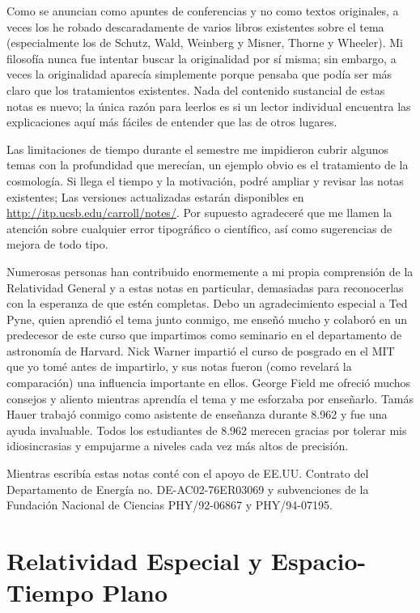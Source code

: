 \documentclass[11pt,b5paper,openany,twoside]{book}
\begin{document}
Como se anuncian como apuntes de conferencias y no como textos originales, a veces los he robado descaradamente de varios libros existentes sobre el tema (especialmente los de Schutz, Wald, Weinberg y Misner, Thorne y Wheeler).
Mi filosofía nunca fue intentar buscar la originalidad por sí misma; sin embargo, a veces la originalidad aparecía simplemente porque pensaba que podía ser más claro que los tratamientos existentes.
Nada del contenido sustancial de estas notas es nuevo; la única razón para leerlos es si un lector individual encuentra las explicaciones aquí más fáciles de entender que las de otros lugares.

Las limitaciones de tiempo durante el semestre me impidieron cubrir algunos temas con la profundidad que merecían, un ejemplo obvio es el tratamiento de la cosmología.
Si llega el tiempo y la motivación, podré ampliar y revisar las notas existentes; Las versiones actualizadas estarán disponibles en \href{http://itp.ucsb.edu/carroll/notes/}{http://itp.ucsb.edu/carroll/notes/}.
Por supuesto agradeceré que me llamen la atención sobre cualquier error tipográfico o científico, así como sugerencias de mejora de todo tipo.

Numerosas personas han contribuido enormemente a mi propia comprensión de la Relatividad General y a estas notas en particular, demasiadas para reconocerlas con la esperanza de que estén completas.
Debo un agradecimiento especial a Ted Pyne, quien aprendió el tema junto conmigo, me enseñó mucho y colaboró en un predecesor de este curso que impartimos como seminario en el departamento de astronomía de Harvard.
Nick Warner impartió el curso de posgrado en el MIT que yo tomé antes de impartirlo, y sus notas fueron (como revelará la comparación) una influencia importante en ellos.
George Field me ofreció muchos consejos y aliento mientras aprendía el tema y me esforzaba por enseñarlo.
Tamás Hauer trabajó conmigo como asistente de enseñanza durante 8.962 y fue una ayuda invaluable.
Todos los estudiantes de 8.962 merecen gracias por tolerar mis idiosincrasias y empujarme a niveles cada vez más altos de precisión.

Mientras escribía estas notas conté con el apoyo de EE.UU.
Contrato del Departamento de Energía no. DE-AC02-76ER03069 y subvenciones de la Fundación Nacional de Ciencias PHY/92-06867 y PHY/94-07195.


\chapter{Relatividad Especial y Espacio-Tiempo Plano}
\end{document}
